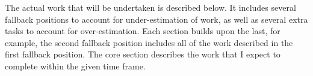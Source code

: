 The actual work that will be undertaken is described below. It includes several fallback positions to account for under-estimation of work, as well as several extra tasks to account for over-estimation. Each section builds upon the last, for example, the second fallback position includes all of the work described in the first fallback position. The core section describes the work that I expect to complete within the given time frame.
